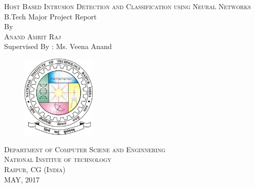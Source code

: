 \documentclass[12pt]{article}
\newcommand{\projectTitle}{Host Based Intrusion Detection and Classification using Neural Networks}
\begin{document}
	\begin{titlepage}
		\vspace*{\fill}
		\begin{center}
			\textsc{\Large \projectTitle}\\
			[0.5in]
			B.Tech Major Project Report\\
			[2in]
			By\\
			[.5in]
			\textsc{Anand Amrit Raj}\\
			Supervised By : Ms. Veena Anand\\
			[.5in]
			\begin{figure}[!h]
				\centering
				\includegraphics[width=100pt]{pictures/nitrr-logo.jpg}
			\end{figure}
			\vspace{.25in}
			\textsc{Department of Computer Sciene and Enginnering}\\
			\textsc{National Institue of technology}\\
			\textsc{Raipur, CG (India)}\\
			MAY, 2017
		\end{center}
	 	\vspace*{\fill}
	\end{titlepage}
	
\end{document}
